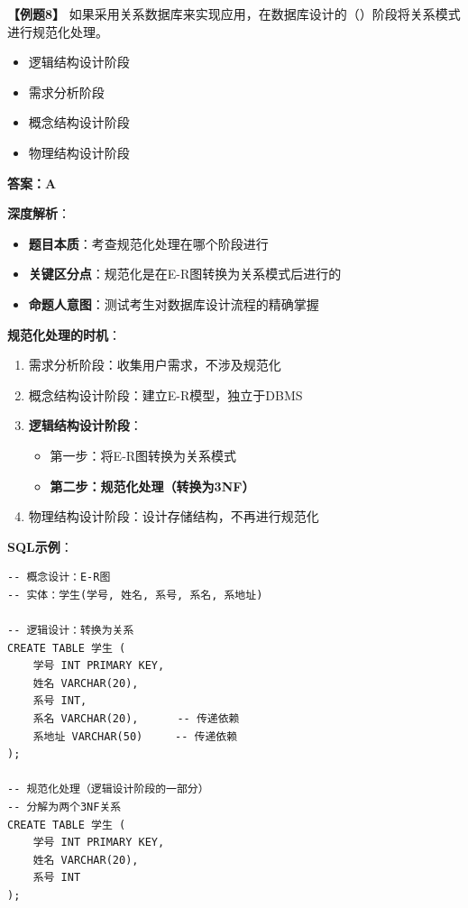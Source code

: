 \documentclass[12pt, a4paper]{article}
\newenvironment{bluebox}[1]{%
  \begin{trivlist}
  \item[\hskip\labelsep \textbf{#1}]
  \setlength{\parskip}{0.5ex}
  \setlength{\itemsep}{0.5ex}
}{%
  \end{trivlist}
  }
\begin{document}
\begin{bluebox}{例题8：规范化阶段}
	\textbf{【例题8】} 如果采用关系数据库来实现应用，在数据库设计的（\quad）阶段将关系模式进行规范化处理。

	\begin{itemize}
		\item[A)] 逻辑结构设计阶段
		\item[B)] 需求分析阶段
		\item[C)] 概念结构设计阶段
		\item[D)] 物理结构设计阶段
	\end{itemize}

	\textbf{答案：A}

	\textbf{深度解析}：

	\begin{itemize}[leftmargin=*, nosep]
		\item \textbf{题目本质}：考查规范化处理在哪个阶段进行
		\item \textbf{关键区分点}：规范化是在E-R图转换为关系模式后进行的
		\item \textbf{命题人意图}：测试考生对数据库设计流程的精确掌握
	\end{itemize}

	\textbf{规范化处理的时机}：

	\begin{enumerate}[leftmargin=*, nosep]
		\item 需求分析阶段：收集用户需求，不涉及规范化
		\item 概念结构设计阶段：建立E-R模型，独立于DBMS
		\item \textbf{逻辑结构设计阶段}：
		      \begin{itemize}[nosep]
			      \item 第一步：将E-R图转换为关系模式
			      \item \textbf{第二步：规范化处理（转换为3NF）}
		      \end{itemize}
		\item 物理结构设计阶段：设计存储结构，不再进行规范化
	\end{enumerate}

	\textbf{SQL示例}：
	\begin{verbatim}
-- 概念设计：E-R图
-- 实体：学生(学号, 姓名, 系号, 系名, 系地址)

-- 逻辑设计：转换为关系
CREATE TABLE 学生 (
    学号 INT PRIMARY KEY,
    姓名 VARCHAR(20),
    系号 INT,
    系名 VARCHAR(20),      -- 传递依赖
    系地址 VARCHAR(50)     -- 传递依赖
);

-- 规范化处理（逻辑设计阶段的一部分）
-- 分解为两个3NF关系
CREATE TABLE 学生 (
    学号 INT PRIMARY KEY,
    姓名 VARCHAR(20),
    系号 INT
);


\end{verbatim}
\end{bluebox}
\end{document}
